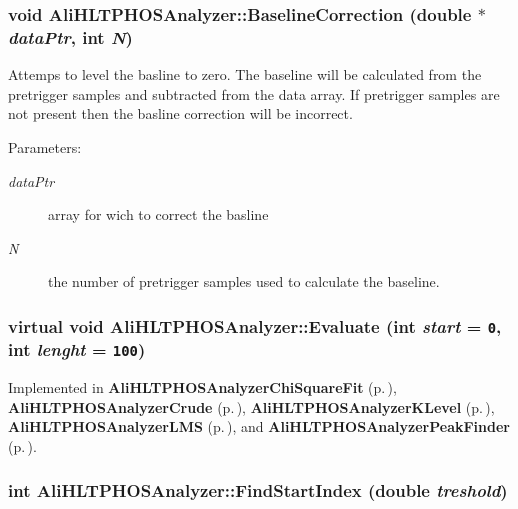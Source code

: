 \subsubsection{\setlength{\rightskip}{0pt plus 5cm}void Ali\-HLTPHOSAnalyzer::Baseline\-Correction (double $\ast$ {\em data\-Ptr}, int {\em N})}\label{classAliHLTPHOSAnalyzer_a5}


Attemps to level the basline to zero. The baseline will be calculated from the pretrigger samples and subtracted from the data array. If pretrigger samples are not present then the basline correction will be incorrect. \begin{Desc}
\item[Parameters:]
\begin{description}
\item[{\em data\-Ptr}]array for wich to correct the basline \item[{\em N}]the number of pretrigger samples used to calculate the baseline. \end{description}
\end{Desc}
\subsubsection{\setlength{\rightskip}{0pt plus 5cm}virtual void Ali\-HLTPHOSAnalyzer::Evaluate (int {\em start} = {\tt 0}, int {\em lenght} = {\tt 100})\hspace{0.3cm}{\tt  [pure virtual]}}\label{classAliHLTPHOSAnalyzer_a14}




Implemented in {\bf Ali\-HLTPHOSAnalyzer\-Chi\-Square\-Fit} {\rm (p.\,\pageref{classAliHLTPHOSAnalyzerChiSquareFit_a4})}, {\bf Ali\-HLTPHOSAnalyzer\-Crude} {\rm (p.\,\pageref{classAliHLTPHOSAnalyzerCrude_a4})}, {\bf Ali\-HLTPHOSAnalyzer\-KLevel} {\rm (p.\,\pageref{classAliHLTPHOSAnalyzerKLevel_a4})}, {\bf Ali\-HLTPHOSAnalyzer\-LMS} {\rm (p.\,\pageref{classAliHLTPHOSAnalyzerLMS_a5})}, and {\bf Ali\-HLTPHOSAnalyzer\-Peak\-Finder} {\rm (p.\,\pageref{classAliHLTPHOSAnalyzerPeakFinder_a6})}.
\subsubsection{\setlength{\rightskip}{0pt plus 5cm}int Ali\-HLTPHOSAnalyzer::Find\-Start\-Index (double {\em treshold})}\label{classAliHLTPHOSAnalyzer_a7}


